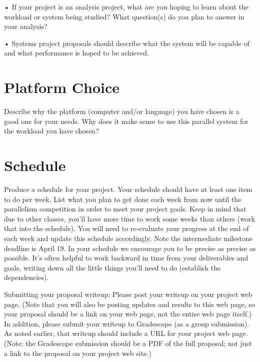 \documentclass[11pt]{article}
\begin{document}
• If your project is an analysis project, what are you hoping to learn about the workload or system being studied? What question(s) do you plan to answer in your analysis?

• Systems project proposals should describe what the system will be capable of and what performance is hoped to be achieved.

\section{Platform Choice}
Describe why the platform (computer and/or language) you have chosen is a good one for your needs. Why does it make sense to use this parallel system for the workload you have chosen?

\section{Schedule}
Produce a schedule for your project. Your schedule should have at least one item to do per week. List what you plan to get done each week from now until the parallelism competition in order to meet your project goals. Keep in mind that due to other classes, you’ll have more time to work some weeks than others (work that into the schedule). You will need to re-evaluate your progress at the end of each week and update this schedule accordingly. Note the intermediate milestone deadline is April 19. In your schedule we encourage you to be precise as precise as possible. It’s often helpful to work backward in time from your deliverables and goals, writing down all the little things you’ll need to do (establish the dependencies).

Submitting your proposal writeup: Please post your writeup on your project web page. (Note that you will also be posting updates and results to this web page, so your proposal should be a link on your web page, not the entire web page itself.) In addition, please submit your writeup to Gradescope (as a group submission). As noted earlier, that writeup should include a URL for your project web page. (Note: the Gradescope submission should be a PDF of the full proposal; not just a link to the proposal on your project web site.)
\end{document}
